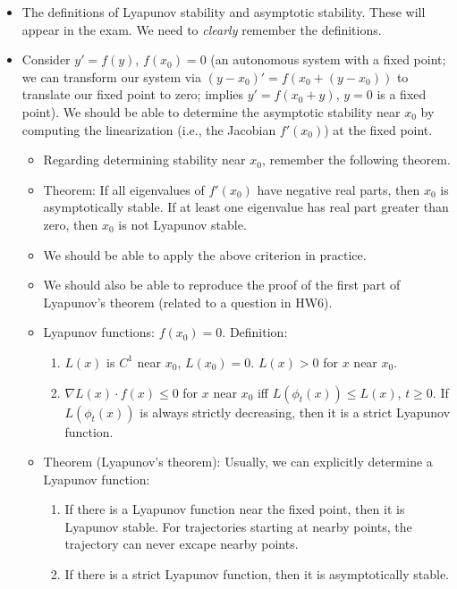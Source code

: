 \documentclass[../notes.tex]{subfiles}
\begin{document}
\begin{itemize}
    \item The definitions of Lyapunov stability and asymptotic stability. These will appear in the exam. We need to \emph{clearly} remember the definitions.
    \item Consider $y'=f(y)$, $f(x_0)=0$ (an autonomous system with a fixed point; we can transform our system via $(y-x_0)'=f(x_0+(y-x_0))$ to translate our fixed point to zero; implies $y'=f(x_0+y)$, $y=0$ is a fixed point). We should be able to determine the asymptotic stability near $x_0$ by computing the linearization (i.e., the Jacobian $f'(x_0)$) at the fixed point.
    \begin{itemize}
        \item Regarding determining stability near $x_0$, remember the following theorem.
        \item Theorem: If all eigenvalues of $f'(x_0)$ have negative real parts, then $x_0$ is asymptotically stable. If at least one eigenvalue has real part greater than zero, then $x_0$ is not Lyapunov stable.
        \item We should be able to apply the above criterion in practice.
        \item We should also be able to reproduce the proof of the first part of Lyapunov's theorem (related to a question in HW6).
        \item Lyapunov functions: $f(x_0)=0$. Definition:
        \begin{enumerate}
            \item $L(x)$ is $C^1$ near $x_0$, $L(x_0)=0$. $L(x)>0$ for $x$ near $x_0$.
            \item $\nabla L(x)\cdot f(x)\leq 0$ for $x$ near $x_0$ iff $L(\phi_t(x))\leq L(x)$, $t\geq 0$. If $L(\phi_t(x))$ is always strictly decreasing, then it is a strict Lyapunov function.
        \end{enumerate}
        \item Theorem (Lyapunov's theorem): Usually, we can explicitly determine a Lyapunov function:
        \begin{enumerate}
            \item If there is a Lyapunov function near the fixed point, then it is Lyapunov stable. For trajectories starting at nearby points, the trajectory can never excape nearby points.
            \item If there is a strict Lyapunov function, then it is asymptotically stable.
        \end{enumerate}
        \begin{itemize}

\end{itemize}
\end{itemize}
\end{itemize}
\end{document}

